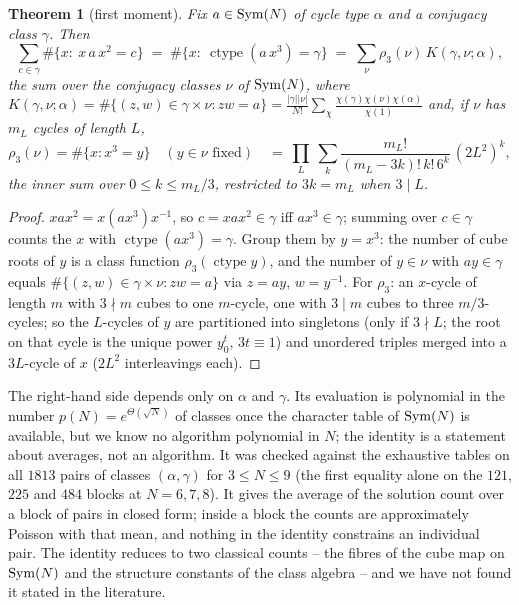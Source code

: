 \documentclass[preprint,12pt]{elsarticle}
\newtheorem{thm}{Theorem}[section]\newtheorem{lem}[thm]{Lemma}\newtheorem{cor}[thm]{Corollary}\newtheorem{prop}[thm]{Proposition}
\theoremstyle{definition}\newtheorem{defi}[thm]{Definition}\newtheorem{prob}[thm]{Problem}\newtheorem{obs}[thm]{Observation}
\theoremstyle{remark}\newtheorem{rem}[thm]{Remark}
\newcommand{\ctype}{\operatorname{ctype}}\DeclareMathOperator{\Cent}{C}\DeclareMathOperator{\supp}{supp}
\begin{document}
\begin{thm}[first moment]\label{thm:firstmoment}\label{prop:moment}
Fix $a\in\operatorname{Sym}(N)$ of cycle type $\alpha$ and a conjugacy class $\gamma$. Then
\[ \sum_{c\in\gamma}\#\{x:\ x\,a\,x^{2}=c\}\;=\;\#\{x:\ \ctype(a\,x^{3})=\gamma\}\;=\;\sum_{\nu}\rho_3(\nu)\,K(\gamma,\nu;\alpha), \]
the sum over the conjugacy classes $\nu$ of $\operatorname{Sym}(N)$,
where $K(\gamma,\nu;\alpha)=\#\{(z,w)\in\gamma\times\nu: zw=a\}=\frac{|\gamma||\nu|}{N!}\sum_{\chi}\frac{\chi(\gamma)\chi(\nu)\chi(\alpha)}{\chi(1)}$
and, if $\nu$ has $m_L$ cycles of length $L$,
\[ \rho_3(\nu)=\#\{x: x^{3}=y\}\quad(y\in\nu\text{ fixed})\quad=\ \prod_L\ \sum_{k}\frac{m_L!}{(m_L-3k)!\,k!\,6^{k}}\,(2L^{2})^{k}, \]
the inner sum over $0\le k\le m_L/3$, restricted to $3k=m_L$ when $3\mid L$.
\end{thm}
\begin{proof}
$xax^{2}=x(ax^{3})x^{-1}$, so $c=xax^{2}\in\gamma$ iff $ax^{3}\in\gamma$; summing over $c\in\gamma$ counts the $x$ with $\ctype(ax^{3})=\gamma$.
Group them by $y=x^{3}$: the number of cube roots of $y$ is a class function $\rho_3(\ctype y)$, and the number of $y\in\nu$ with $ay\in\gamma$
equals $\#\{(z,w)\in\gamma\times\nu: zw=a\}$ via $z=ay$, $w=y^{-1}$. For $\rho_3$: an $x$-cycle of length $m$ with $3\nmid m$ cubes to one
$m$-cycle, one with $3\mid m$ cubes to three $m/3$-cycles; so the $L$-cycles of $y$ are partitioned into singletons (only if $3\nmid L$; the root
on that cycle is the unique power $y_0^{t}$, $3t\equiv1$) and unordered triples merged into a $3L$-cycle of $x$ ($2L^{2}$ interleavings each).
\end{proof}
The right-hand side depends only on $\alpha$ and $\gamma$. Its evaluation is polynomial in the number $p(N)=e^{\Theta(\sqrt N)}$ of classes once the character table of $\operatorname{Sym}(N)$ is available, but we know no algorithm polynomial in $N$; the identity is a statement about averages, not an algorithm. It was checked against the exhaustive tables on all $1813$ pairs of classes $(\alpha,\gamma)$ for $3\le N\le9$ (the first equality alone on the $121$, $225$ and $484$ blocks at $N=6,7,8$). It gives the average of the solution count over a block of pairs in closed form; inside a block the counts are approximately Poisson with that mean, and nothing in the identity constrains an individual pair. The identity reduces to two classical counts -- the fibres of the cube map on $\operatorname{Sym}(N)$ \cite{chowla1951,moser1955,pavlov1981,chernoff1994} and the structure constants of the class algebra \cite{goupil1990,bedard1992} -- and we have not found it stated in the literature.
\end{document}

